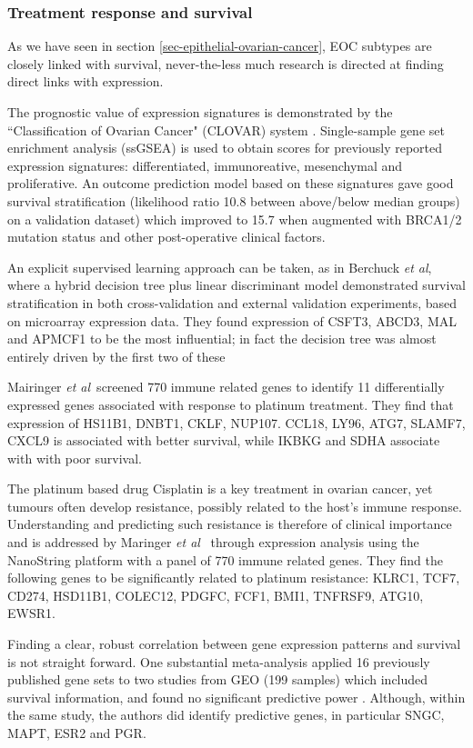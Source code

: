 \documentclass[draft,tikz, 12pt,a4paper,oneside,fleqn]{article}
\newcommand{\etal}{{\em et al\/}}
\begin{document}
\subsubsection{Treatment response and survival}

As we have seen in section \ref{sec-epithelial-ovarian-cancer}, EOC subtypes are closely linked with survival, never-the-less much research is directed at finding direct links with expression.

The prognostic value of expression signatures is demonstrated by the ``Classification of Ovarian Cancer" (CLOVAR) system \cite{Verhaak2013}.  
Single-sample gene set enrichment analysis (ssGSEA) is used to obtain scores for previously reported expression signatures: differentiated, immunoreative, mesenchymal and proliferative.  
An outcome prediction model based on these signatures gave good survival stratification (likelihood ratio 10.8 between above/below median groups) on a validation dataset) which improved to 15.7 when augmented with BRCA1/2 mutation status and other post-operative clinical factors.

An explicit supervised learning approach can be taken, as in Berchuck \etal, where a hybrid decision tree plus linear discriminant model demonstrated survival stratification in both cross-validation and external validation experiments, based on microarray expression data.   
They found expression of CSFT3, ABCD3, MAL and APMCF1 to be the most influential; in fact the decision tree was almost entirely driven by the first two of these

Mairinger \etal\ screened 770 immune related genes to identify 11 differentially expressed genes associated with response to platinum treatment.  
They find that expression of HS11B1, DNBT1, CKLF, NUP107. CCL18, LY96, ATG7, SLAMF7, CXCL9 is associated with better survival, while IKBKG and SDHA associate with with poor survival.

The platinum based drug Cisplatin is a key treatment in ovarian cancer, yet tumours often develop resistance, possibly related to the host's immune response.  
Understanding and predicting such resistance is therefore of clinical importance and is addressed by Maringer \etal\ \cite{Mairinger2019} through expression analysis using the NanoString platform with a panel of 770 immune related genes.   
They find the following genes to be significantly related to platinum resistance: KLRC1, TCF7, CD274, HSD11B1, COLEC12, PDGFC, FCF1, BMI1, TNFRSF9, ATG10, EWSR1.

Finding a clear, robust correlation between gene expression patterns and survival is not straight forward.  
One substantial meta-analysis applied 16 previously published gene sets to two studies from GEO (199 samples) which included survival information, and found no significant predictive power \cite{Fekete2012}.  
Although, within the same study, the authors did identify predictive genes, in particular SNGC, MAPT, ESR2 and PGR.
\end{document}
